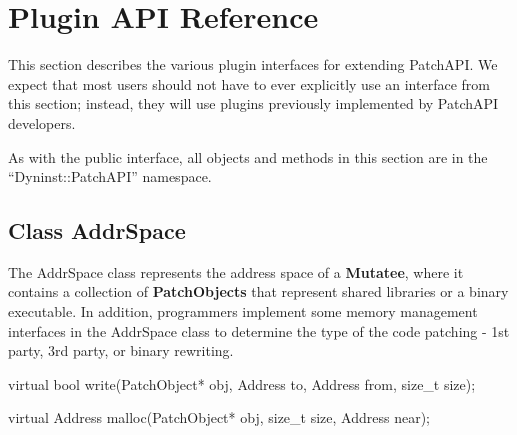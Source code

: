 \section{Plugin API Reference}
\label{sec:plugin-api}

This section describes the various plugin interfaces for extending PatchAPI. We
expect that most users should not have to ever explicitly use an interface from
this section; instead, they will use plugins previously implemented by PatchAPI
developers.

As with the public interface, all objects and methods in this section are in the
``Dyninst::PatchAPI'' namespace.

\subsection{Class AddrSpace}
\label{sec:addrspace}


The AddrSpace class represents the address space of a \textbf{Mutatee}, where it
contains a collection of \textbf{PatchObjects} that represent shared libraries
or a binary executable. In addition, programmers implement some memory
management interfaces in the AddrSpace class to determine the type of the code
patching - 1st party, 3rd party, or binary rewriting.


\begin{apient}
virtual bool write(PatchObject* obj, Address to, Address from, size_t size);
\end{apient}



\begin{apient}
virtual Address malloc(PatchObject* obj, size_t size, Address near);
\end{apient}



